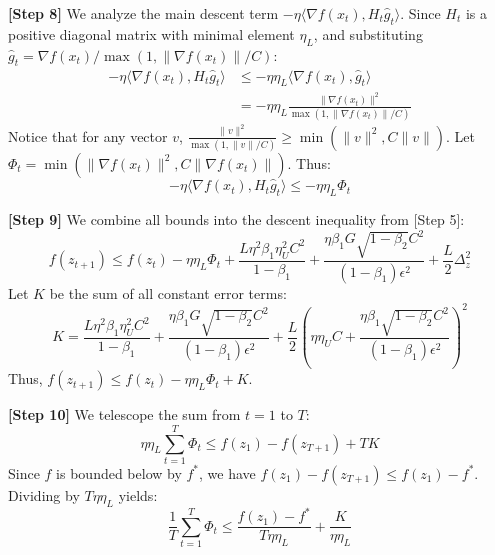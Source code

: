 \documentclass{article}
\begin{document}
\textbf{[Step 8]} We analyze the main descent term $- \eta \langle \nabla f(x_t), H_t \hat{g}_t \rangle$. Since $H_t$ is a positive diagonal matrix with minimal element $\eta_L$, and substituting $\hat{g}_t = \nabla f(x_t) / \max(1, \|\nabla f(x_t)\|/C)$:
\begin{align}
    - \eta \langle \nabla f(x_t), H_t \hat{g}_t \rangle &\leq - \eta \eta_L \langle \nabla f(x_t), \hat{g}_t \rangle \nonumber \\
    &= - \eta \eta_L \frac{\|\nabla f(x_t)\|^2}{\max(1, \|\nabla f(x_t)\|/C)}
\end{align}
Notice that for any vector $v$, $\frac{\|v\|^2}{\max(1, \|v\|/C)} \geq \min(\|v\|^2, C\|v\|)$. Let $\Phi_t = \min(\|\nabla f(x_t)\|^2, C\|\nabla f(x_t)\|)$. Thus:
\begin{equation}
    - \eta \langle \nabla f(x_t), H_t \hat{g}_t \rangle \leq - \eta \eta_L \Phi_t
\end{equation}

\textbf{[Step 9]} We combine all bounds into the descent inequality from [Step 5]:
\begin{equation}
    f(z_{t+1}) \leq f(z_t) - \eta \eta_L \Phi_t + \frac{L \eta^2 \beta_1 \eta_U^2 C^2}{1-\beta_1} + \frac{\eta \beta_1 G \sqrt{1-\beta_2} C^2}{(1-\beta_1)\epsilon^2} + \frac{L}{2} \Delta_z^2
\end{equation}
Let $K$ be the sum of all constant error terms:
\begin{equation}
    K = \frac{L \eta^2 \beta_1 \eta_U^2 C^2}{1-\beta_1} + \frac{\eta \beta_1 G \sqrt{1-\beta_2} C^2}{(1-\beta_1)\epsilon^2} + \frac{L}{2} \left( \eta \eta_U C + \frac{\eta \beta_1 \sqrt{1-\beta_2} C^2}{(1-\beta_1)\epsilon^2} \right)^2
\end{equation}
Thus, $f(z_{t+1}) \leq f(z_t) - \eta \eta_L \Phi_t + K$.

\textbf{[Step 10]} We telescope the sum from $t=1$ to $T$:
\begin{equation}
    \eta \eta_L \sum_{t=1}^T \Phi_t \leq f(z_1) - f(z_{T+1}) + T K
\end{equation}
Since $f$ is bounded below by $f^*$, we have $f(z_1) - f(z_{T+1}) \leq f(z_1) - f^*$. Dividing by $T \eta \eta_L$ yields:
\begin{equation}
    \frac{1}{T} \sum_{t=1}^T \Phi_t \leq \frac{f(z_1) - f^*}{T \eta \eta_L} + \frac{K}{\eta \eta_L}
\end{equation}
\end{document}
